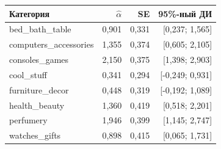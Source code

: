 \begin{tabular}{lrrr}
\toprule
Категория & $\widehat\alpha$ & SE & 95\%-ный ДИ \\
\midrule
bed\_bath\_table & 0,901 & 0,331 & [0,237; 1,565] \\
computers\_accessories & 1,355 & 0,374 & [0,605; 2,105] \\
consoles\_games & 2,150 & 0,375 & [1,398; 2,903] \\
cool\_stuff & 0,341 & 0,294 & [-0,249; 0,931] \\
furniture\_decor & 0,448 & 0,319 & [-0,192; 1,089] \\
health\_beauty & 1,360 & 0,419 & [0,518; 2,201] \\
perfumery & 1,946 & 0,399 & [1,145; 2,747] \\
watches\_gifts & 0,898 & 0,415 & [0,065; 1,731] \\
\bottomrule
\end{tabular}

